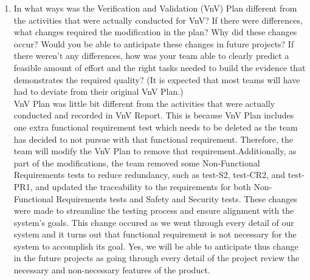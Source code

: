 \documentclass[12pt, titlepage]{article}
\begin{document}
\begin{enumerate}
  \item In what ways was the Verification and Validation (VnV) Plan different
  from the activities that were actually conducted for VnV?  If there were
  differences, what changes required the modification in the plan?  Why did
  these changes occur?  Would you be able to anticipate these changes in future
  projects?  If there weren't any differences, how was your team able to clearly
  predict a feasible amount of effort and the right tasks needed to build the
  evidence that demonstrates the required quality?  (It is expected that most
  teams will have had to deviate from their original VnV Plan.)\\
  VnV Plan was little bit different from the activities that were actually conducted and recorded in VnV Report. This is because VnV Plan includes one extra functional requirement test which needs to be deleted as the team has decided to not pursue with that functional requirement. Therefore, the team will modify the VnV Plan to remove that requirement.Additionally, as part of the modifications, the team removed some Non-Functional Requirements tests to reduce redundancy, such as test-S2, test-CR2, and test-PR1, and updated the traceability to the requirements for both Non-Functional Requirements tests and Safety and Security tests. These changes were made to streamline the testing process and ensure alignment with the system's goals. This change occured as we went through every detail of our system and it turns out that functional requirement is not necessary for the system to accomplish its goal. Yes, we will be able to anticipate thus change in the future projects as going through every detail of the project review the necessary and non-necessary features of the product.  

\end{enumerate}
\end{document}
